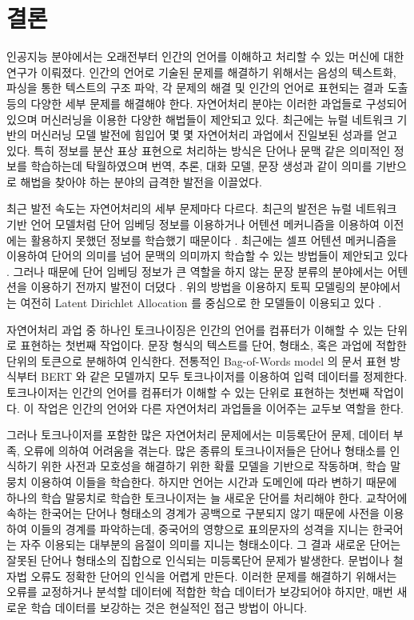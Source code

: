 \documentclass[oneside, ko,phd]{snuthesis_utf8_kor}
\begin{document}
\newpage
\chapter{결론} \label{conclusion}

인공지능 분야에서는 오래전부터 인간의 언어를 이해하고 처리할 수 있는 머신에 대한 연구가 이뤄졌다.
인간의 언어로 기술된 문제를 해결하기 위해서는 음성의 텍스트화, 파싱을 통한 텍스트의 구조 파악, 각 문제의 해결 및 인간의 언어로 표현되는 결과 도출 등의 다양한 세부 문제를 해결해야 한다.
자연어처리 분야는 이러한 과업들로 구성되어 있으며 머신러닝을 이용한 다양한 해법들이 제안되고 있다.
최근에는 뉴럴 네트워크 기반의 머신러닝 모델 발전에 힘입어 몇 몇 자연어처리 과업에서 진일보된 성과를 얻고 있다.
특히 정보를 분산 표상 표현으로 처리하는 방식은 단어나 문맥 같은 의미적인 정보를 학습하는데 탁월하였으며 번역, 추론, 대화 모델, 문장 생성과 같이 의미를 기반으로 해법을 찾아야 하는 분야의 급격한 발전을 이끌었다.

최근 발전 속도는 자연어처리의 세부 문제마다 다르다.
최근의 발전은 뉴럴 네트워크 기반 언어 모델처럼 단어 임베딩 정보를 이용하거나 어텐션 메커니즘을 이용하여 이전에는 활용하지 못했던 정보를 학습했기 때문이다 \cite{joulin2016bag, bahdanau2014neural, lin2017structured}.
최근에는 셀프 어텐션 메커니즘을 이용하여 단어의 의미를 넘어 문맥의 의미까지 학습할 수 있는 방법들이 제안되고 있다 \cite{vaswani2017attention, devlin2018bert}.
그러나 때문에 단어 임베딩 정보가 큰 역할을 하지 않는 문장 분류의 분야에서는 어텐션을 이용하기 전까지 발전이 더뎠다 \cite{yang2016hierarchical}.
위의 방법을 이용하지 토픽 모델링의 분야에서는 여전히 Latent Dirichlet Allocation \cite{blei2003latent} 를 중심으로 한 모델들이 이용되고 있다 \cite{allahyari2017brief}.

자연어처리 과업 중 하나인 토크나이징은 인간의 언어를 컴퓨터가 이해할 수 있는 단위로 표현하는 첫번째 작업이다.
문장 형식의 텍스트를 단어, 형태소, 혹은 과업에 적합한 단위의 토큰으로 분해하여 인식한다.
전통적인 Bag-of-Words model 의 문서 표현 방식부터 BERT 와 같은 모델까지 모두 토크나이저를 이용하여 입력 데이터를 정제한다.
토크나이저는 인간의 언어를 컴퓨터가 이해할 수 있는 단위로 표현하는 첫번째 작업이다.
이 작업은 인간의 언어와 다른 자연어처리 과업들을 이어주는 교두보 역할을 한다.

그러나 토크나이저를 포함한 많은 자연어처리 문제에서는 미등록단어 문제, 데이터 부족, 오류에 의하여 어려움을 겪는다.
많은 종류의 토크나이저들은 단어나 형태소를 인식하기 위한 사전과 모호성을 해결하기 위한 확률 모델을 기반으로 작동하며, 학습 말뭉치 이용하여 이들을 학습한다.
하지만 언어는 시간과 도메인에 따라 변하기 때문에 하나의 학습 말뭉치로 학습한 토크나이저는 늘 새로운 단어를 처리해야 한다.
교착어에 속하는 한국어는 단어나 형태소의 경계가 공백으로 구분되지 않기 때문에 사전을 이용하여 이들의 경계를 파악하는데, 중국어의 영향으로 표의문자의 성격을 지니는 한국어는 자주 이용되는 대부분의 음절이 의미를 지니는 형태소이다.
그 결과 새로운 단어는 잘못된 단어나 형태소의 집합으로 인식되는 미등록단어 문제가 발생한다.
문법이나 철자법 오류도 정확한 단어의 인식을 어렵게 만든다.
이러한 문제를 해결하기 위해서는 오류를 교정하거나 분석할 데이터에 적합한 학습 데이터가 보강되어야 하지만, 매번 새로운 학습 데이터를 보강하는 것은 현실적인 접근 방법이 아니다.
\end{document}
